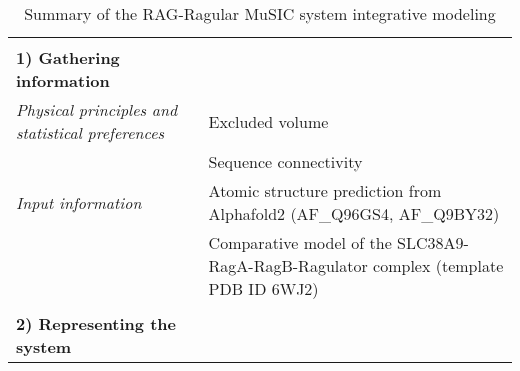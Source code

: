 \documentclass[11pt,a4paper]{article}
\begin{document}
\setcounter{table}{0}

\begin{landscape}
\begin{longtable}{ p{} | p{} } 
\caption{Summary of the RAG-Ragular MuSIC system integrative modeling}
  
  &  \\
  \textbf{1) Gathering information} & \\
    \hline

                \textit{Physical principles and statistical preferences} & Excluded volume\\
            & Sequence connectivity \\
                \textit{Input information} & Atomic structure prediction from Alphafold2 (AF\_Q96GS4, AF\_Q9BY32)\\
            & Comparative model of the SLC38A9-RagA-RagB-Ragulator complex (template PDB ID 6WJ2) \\
          
    &  \\
    \normalsize{\textbf{2) Representing the system}} & \\
    \hline
    

\end{longtable}
\end{landscape}
\end{document}

